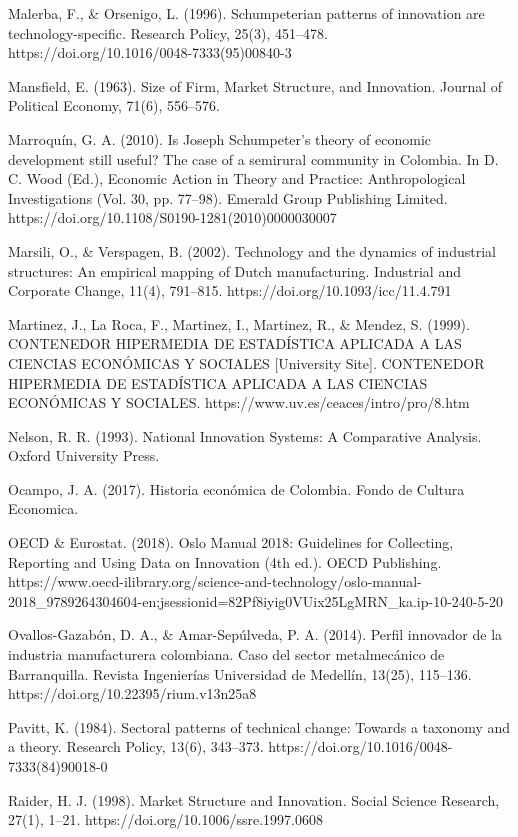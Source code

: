 \documentclass[12pt,a4paper]{article}
\begin{document}
{Malerba, F., \& Orsenigo, L. (1996). Schumpeterian patterns of innovation are technology-specific. Research Policy, 25(3), 451–478. https://doi.org/10.1016/0048-7333(95)00840-3

Mansfield, E. (1963). Size of Firm, Market Structure, and Innovation. Journal of Political Economy, 71(6), 556–576.

Marroquín, G. A. (2010). Is Joseph Schumpeter’s theory of economic development still useful? The case of a semirural community in Colombia. In D. C. Wood (Ed.), Economic Action in Theory and Practice: Anthropological Investigations (Vol. 30, pp. 77–98). Emerald Group Publishing Limited. https://doi.org/10.1108/S0190-1281(2010)0000030007

Marsili, O., \& Verspagen, B. (2002). Technology and the dynamics of industrial structures: An empirical mapping of Dutch manufacturing. Industrial and Corporate Change, 11(4), 791–815. https://doi.org/10.1093/icc/11.4.791

Martinez, J., La Roca, F., Martinez, I., Martinez, R., \& Mendez, S. (1999). CONTENEDOR HIPERMEDIA DE ESTADÍSTICA APLICADA A LAS CIENCIAS ECONÓMICAS Y SOCIALES [University Site]. CONTENEDOR HIPERMEDIA DE ESTADÍSTICA APLICADA A LAS CIENCIAS ECONÓMICAS Y SOCIALES. https://www.uv.es/ceaces/intro/pro/8.htm

Nelson, R. R. (1993). National Innovation Systems: A Comparative Analysis. Oxford University Press.

Ocampo, J. A. (2017). Historia económica de Colombia. Fondo de Cultura Economica.

OECD \& Eurostat. (2018). Oslo Manual 2018: Guidelines for Collecting, Reporting and Using Data on Innovation (4th ed.). OECD Publishing. https://www.oecd-ilibrary.org/science-and-technology/oslo-manual-2018\_9789264304604-en;jsessionid=82Pf8iyig0VUix25LgMRN\_ka.ip-10-240-5-20

Ovallos-Gazabón, D. A., \& Amar-Sepúlveda, P. A. (2014). Perfil innovador de la industria manufacturera colombiana. Caso del sector metalmecánico de Barranquilla. Revista Ingenierías Universidad de Medellín, 13(25), 115–136. https://doi.org/10.22395/rium.v13n25a8

Pavitt, K. (1984). Sectoral patterns of technical change: Towards a taxonomy and a theory. Research Policy, 13(6), 343–373. https://doi.org/10.1016/0048-7333(84)90018-0

Raider, H. J. (1998). Market Structure and Innovation. Social Science Research, 27(1), 1–21. https://doi.org/10.1006/ssre.1997.0608

}
\end{document}
